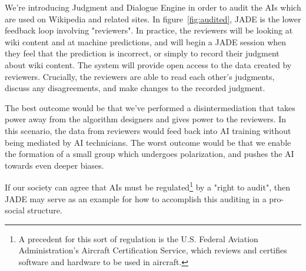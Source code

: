 \documentclass[format=sigconf, authorversion]{acmart}
\begin{document}
We're introducing Judgment and Dialogue Engine in order to audit the AIs which are used on Wikipedia and related sites.  In figure~\ref{fig:audited}, JADE is the lower feedback loop involving "reviewers".  In practice, the reviewers will be looking at wiki content and at machine predictions, and will begin a JADE session when they feel that the prediction is incorrect, or simply to record their judgment about wiki content.  The system will provide open access to the data created by reviewers.  Crucially, the reviewers are able to read each other's judgments, discuss any disagreements, and make changes to the recorded judgment.

The best outcome would be that we've performed a disintermediation that takes power away from the algorithm designers and gives power to the reviewers.  In this scenario, the data from reviewers would feed back into AI training without being mediated by AI technicians.  The worst outcome would be that we enable the formation of a small group which undergoes polarization, and pushes the AI towards even deeper biases.

If our society can agree that AIs must be regulated\footnote{A precedent for this sort of regulation is the U.S. Federal Aviation Administration's Aircraft Certification Service, which reviews and certifies software and hardware to be used in aircraft.} by a "right to audit", then JADE may serve as an example for how to accomplish this auditing in a pro-social structure.
\end{document}

